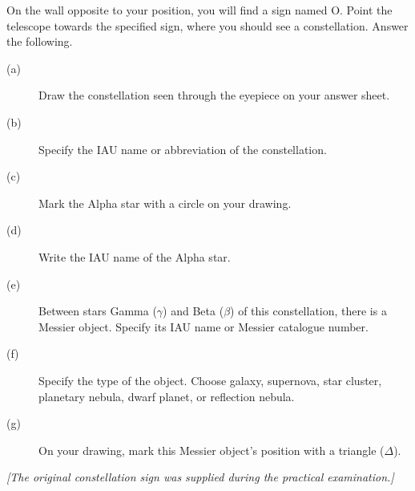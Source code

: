 On the wall opposite to your position, you will find a sign named O. Point the telescope towards the specified sign, where you should see a constellation. Answer the following.
\begin{description}
\item[(a)] Draw the constellation seen through the eyepiece on your answer sheet.
\item[(b)] Specify the IAU name or abbreviation of the constellation.
\item[(c)] Mark the Alpha star with a circle on your drawing.
\item[(d)] Write the IAU name of the Alpha star.
\item[(e)] Between stars Gamma ($\gamma$) and Beta ($\beta$) of this constellation, there is a Messier object. Specify its IAU name or Messier catalogue number.
\item[(f)] Specify the type of the object. Choose galaxy, supernova, star cluster, planetary nebula, dwarf planet, or reflection nebula.
\item[(g)] On your drawing, mark this Messier object's position with a triangle ($\Delta$).
\end{description}
\textit{[The original constellation sign was supplied during the practical examination.]}
